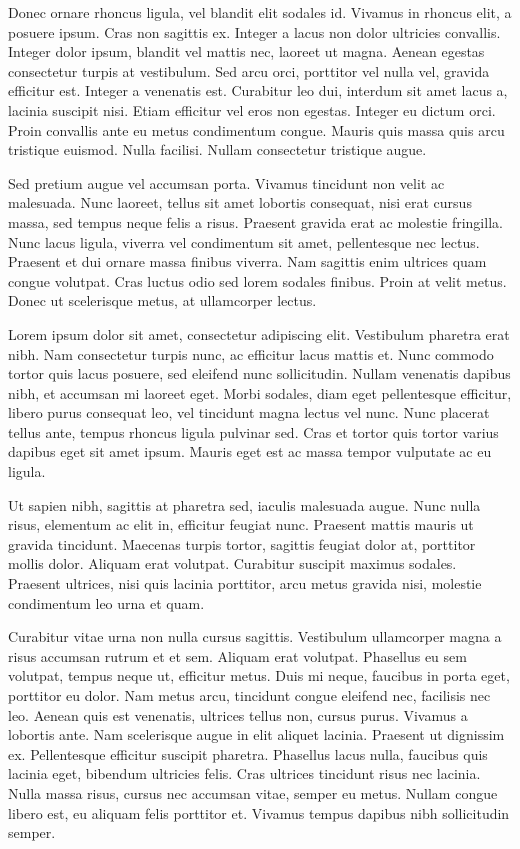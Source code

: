 \documentclass[a4paper]{memoir}
\begin{document}
Donec ornare rhoncus ligula, vel blandit elit sodales id. Vivamus in rhoncus elit, a posuere ipsum. Cras non sagittis ex. Integer a lacus non dolor ultricies convallis. Integer dolor ipsum, blandit vel mattis nec, laoreet ut magna. Aenean egestas consectetur turpis at vestibulum. Sed arcu orci, porttitor vel nulla vel, gravida efficitur est. Integer a venenatis est. Curabitur leo dui, interdum sit amet lacus a, lacinia suscipit nisi. Etiam efficitur vel eros non egestas. Integer eu dictum orci. Proin convallis ante eu metus condimentum congue. Mauris quis massa quis arcu tristique euismod. Nulla facilisi. Nullam consectetur tristique augue. 

Sed pretium augue vel accumsan porta. Vivamus tincidunt non velit ac malesuada. Nunc laoreet, tellus sit amet lobortis consequat, nisi erat cursus massa, sed tempus neque felis a risus. Praesent gravida erat ac molestie fringilla. Nunc lacus ligula, viverra vel condimentum sit amet, pellentesque nec lectus. Praesent et dui ornare massa finibus viverra. Nam sagittis enim ultrices quam congue volutpat. Cras luctus odio sed lorem sodales finibus. Proin at velit metus. Donec ut scelerisque metus, at ullamcorper lectus. 

Lorem ipsum dolor sit amet, consectetur adipiscing elit. Vestibulum pharetra erat nibh. Nam consectetur turpis nunc, ac efficitur lacus mattis et. Nunc commodo tortor quis lacus posuere, sed eleifend nunc sollicitudin. Nullam venenatis dapibus nibh, et accumsan mi laoreet eget. Morbi sodales, diam eget pellentesque efficitur, libero purus consequat leo, vel tincidunt magna lectus vel nunc. Nunc placerat tellus ante, tempus rhoncus ligula pulvinar sed. Cras et tortor quis tortor varius dapibus eget sit amet ipsum. Mauris eget est ac massa tempor vulputate ac eu ligula. 

Ut sapien nibh, sagittis at pharetra sed, iaculis malesuada augue. Nunc nulla risus, elementum ac elit in, efficitur feugiat nunc. Praesent mattis mauris ut gravida tincidunt. Maecenas turpis tortor, sagittis feugiat dolor at, porttitor mollis dolor. Aliquam erat volutpat. Curabitur suscipit maximus sodales. Praesent ultrices, nisi quis lacinia porttitor, arcu metus gravida nisi, molestie condimentum leo urna et quam. 

Curabitur vitae urna non nulla cursus sagittis. Vestibulum ullamcorper magna a risus accumsan rutrum et et sem. Aliquam erat volutpat. Phasellus eu sem volutpat, tempus neque ut, efficitur metus. Duis mi neque, faucibus in porta eget, porttitor eu dolor. Nam metus arcu, tincidunt congue eleifend nec, facilisis nec leo. Aenean quis est venenatis, ultrices tellus non, cursus purus. Vivamus a lobortis ante. Nam scelerisque augue in elit aliquet lacinia. Praesent ut dignissim ex. Pellentesque efficitur suscipit pharetra. Phasellus lacus nulla, faucibus quis lacinia eget, bibendum ultricies felis. Cras ultrices tincidunt risus nec lacinia. Nulla massa risus, cursus nec accumsan vitae, semper eu metus. Nullam congue libero est, eu aliquam felis porttitor et. Vivamus tempus dapibus nibh sollicitudin semper. 
\end{document}
